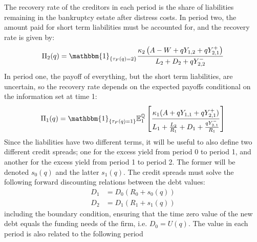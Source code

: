 \documentclass[main.tex]{subfiles}
\begin{document}
        The recovery rate of the creditors in each period
        is the share of liabilities remaining in the bankruptcy estate after distress costs.
        In period two, the amount paid for short term liabilities must be accounted for,
        and the recovery rate is given by:
        \begin{align}
            \Pi_{2}(q) 
            = 
            \mathbbm{1}_{\{\tau_{F}(q)=2\}}
            \frac{
                \kappa_2 \left(
                A - W + q Y_{1,2} + q Y_{2,1}^{+}
                \right)
            }{
                L_{2}
                +
                D_{2}
                +
                q Y_{2,2}^{-} 
            }
        \end{align}
        In period one, the payoff of everything, but the short term liabilities, are uncertain,
        so the recovery rate depends on the expected payoffs
        conditional on the information set at time 1:
        \begin{align}
            \Pi_{1}(q) 
            = 
            \mathbbm{1}_{\{\tau_{F}(q)=1\}}
            \mathbb{E}_{1}^{\rnmeasure}\left[
                \frac{
                    \kappa_1
                    (A + q Y_{1,1} + q Y_{2,1}^{+})
                }{
                    L_{1}
                    +
                    \frac{L_{2}}{R_{1}}
                    +
                    D_{1}
                    +
                    \frac{q Y_{2,1}^{-}}{R_{1}}
                }
            \right] 
        \end{align}
        Since the liabilities have two different terms, 
        it will be useful to also define two different credit spreads;
        one for the excess yield from period 0 to period 1,
        and another for the excess yield from period 1 to period 2.
        The former will be denoted $s_{0}(q)$ and the latter $s_{1}(q)$.
        The credit spreads must solve the following forward discounting relations
        between the debt values:
        \begin{align}
            D_{1} 
            &= 
            D_{0}(R_{0} + s_{0}(q)) 
            \nonumber \\
            D_{2} 
            &= 
            D_{1}(R_{1} + s_{1}(q))
            \nonumber 
        \end{align}
        including the boundary condition, ensuring that the time zero value of the new debt 
        equals the funding needs of the firm, i.e. $D_{0} = U(q)$.
        The value in each period is also related to the following period 
\end{document}
